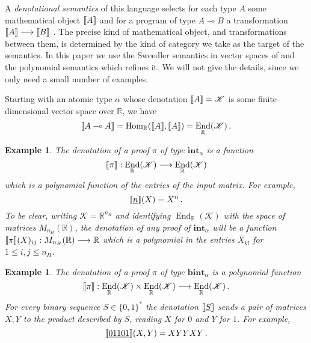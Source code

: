 \documentclass[english,letter paper,12pt,leqno]{article}
\theoremstyle{example}
\newtheorem{example}[theorem]{Example}
\numberwithin{equation}{section}
\def\Hom{\operatorname{Hom}}
\DeclareMathOperator{\End}{End}
\begin{document}

A \emph{denotational semantics} of this language selects for each type $A$ some mathematical object $\llbracket A \rrbracket$ and for a program of type $A \multimap B$ a transformation $\llbracket A \rrbracket \longrightarrow \llbracket B \rrbracket$ \cite{mellies}. The precise kind of mathematical object, and transformations between them, is determined by the kind of category we take as the target of the semantics. In this paper we use the Sweedler semantics in vector spaces of \cite{murfet_logic,murfet_coalg} and the polynomial semantics which refines it. We will not give the details, since we only need a small number of examples.

Starting with an atomic type $\alpha$ whose denotation $\llbracket A \rrbracket = \mathscr{K}$ is some finite-dimensional vector space over $\mathbb{R}$, we have
\begin{align*}
\den{A \multimap A} = \Hom_{\mathbb{R}}( \den{A}, \den{A} ) = \End_{\mathbb{R}}(\mathscr{K})\,.
\end{align*}

\begin{example}\label{example_1} The denotation of a proof $\pi$ of type $\textbf{int}_\alpha$ is a function
\[
\den{\pi}: \End_{\mathbb{R}}(\mathscr{K}) \lto \End_{\mathbb{R}}(\mathscr{K})
\]
which is a polynomial function of the entries of the input matrix. For example,
\[
\llbracket \underline{n} \rrbracket(X) = X^n\,.
\]
To be clear, writing $\mathscr{K} = \mathbb{R}^{n_H}$ and identifying $\End_{\mathbb{R}}(\mathscr{K})$ with the space of matrices $M_{n_H}(\mathbb{R})$, the denotation of any proof of $\textbf{int}_\alpha$ will be a function $\llbracket \pi \rrbracket(X)_{ij}: M_{n_H}(\mathbb{R}) \longrightarrow \mathbb{R}$ which is a polynomial in the entries $X_{kl}$ for $1 \le i, j \le n_H$.
\end{example}

\begin{example}\label{example_2} The denotation of a proof $\pi$ of type $\textbf{bint}_\alpha$ is a polynomial function
\[
\den{\pi}: \End_{\mathbb{R}}(\mathscr{K}) \times \End_{\mathbb{R}}(\mathscr{K}) \lto \End_{\mathbb{R}}(\mathscr{K})\,.
\]
For every binary sequence $S \in \{0,1\}^*$ the denotation $\llbracket \underline{S} \rrbracket$ sends a pair of matrices $X,Y$ to the product described by $S$, reading $X$ for $0$ and $Y$ for $1$. For example,
\[
\llbracket \underline{01101} \rrbracket(X,Y) = X Y Y X Y\,.
\]
\end{example}
\end{document}
